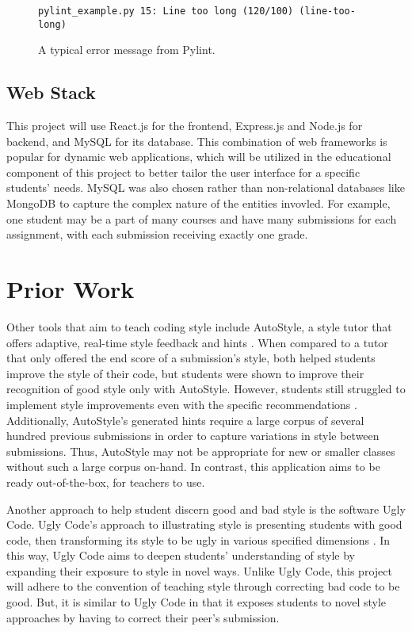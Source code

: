 \documentclass[10pt,twocolumn]{article}
\begin{document}
\begin{figure}
\begin{lstlisting}
pylint_example.py 15: Line too long (120/100) (line-too-long)
\end{lstlisting}
	\centering
	\caption{A typical error message from Pylint.}
\end{figure}

\subsection{Web Stack}
This project will use React.js for the frontend, Express.js and Node.js for backend, and MySQL for its database. 
This combination of web frameworks is popular for dynamic web applications, which will be utilized in the educational component of this project to better tailor the user interface for a specific students' needs. 
MySQL was also chosen rather than non-relational databases like MongoDB to capture the complex nature of the entities invovled. 
For example, one student may be a part of many courses and have many submissions for each assignment, with each submission receiving exactly one grade.


\section{Prior Work}
Other tools that aim to teach coding style include AutoStyle, a style tutor that offers adaptive, real-time style feedback and hints \cite{moghadam_2015}. 
When compared to a tutor that only offered the end score of a submission’s style, both helped students improve the style of their code, but students were shown to improve their recognition of good style only with AutoStyle. 
However, students still struggled to implement style improvements even with the specific recommendations \cite{wiese_2017}. 
Additionally, AutoStyle’s generated hints require a large corpus of several hundred previous submissions in order to capture variations in style between submissions. 
Thus, AutoStyle may not be appropriate for new or smaller classes without such a large corpus on-hand. 
In contrast, this application aims to be ready out-of-the-box, for teachers to use.

Another approach to help student discern good and bad style is the software Ugly Code.
Ugly Code's approach to illustrating style is presenting students with good code, then transforming its style to be ugly in various specified dimensions \cite{mcmaster_2013}. 
In this way, Ugly Code aims to deepen students' understanding of style by expanding their exposure to style in novel ways. 
Unlike Ugly Code, this project will adhere to the convention of teaching style through correcting bad code to be good. 
But, it is similar to Ugly Code in that it exposes students to novel style approaches by having to correct their peer's submission. 

\printbibliography 
\end{document}
